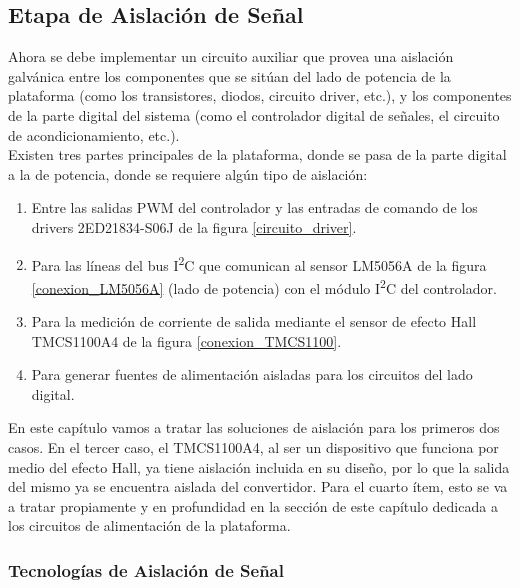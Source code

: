 \subsection{Etapa de Aislación de Señal}

Ahora se debe implementar un circuito auxiliar que provea una aislación galvánica entre los componentes que se sitúan del lado de potencia de la plataforma (como los transistores, diodos, circuito driver, etc.), y los componentes de la parte digital del sistema (como el controlador digital de señales, el circuito de acondicionamiento, etc.).\\

Existen tres partes principales de la plataforma, donde se pasa de la parte digital a la de potencia, donde se requiere algún tipo de aislación:\\

\begin{enumerate}
    \item Entre las salidas PWM del controlador y las entradas de comando de los drivers 2ED21834-S06J de la figura \ref{circuito_driver}.
    \item Para las líneas del bus I\textsuperscript{2}C que comunican al sensor LM5056A de la figura \ref{conexion_LM5056A} (lado de potencia) con el módulo I\textsuperscript{2}C del controlador.
    \item Para la medición de corriente de salida mediante el sensor de efecto Hall TMCS1100A4 de la figura \ref{conexion_TMCS1100}.
    \item Para generar fuentes de alimentación aisladas para los circuitos del lado digital.\\
\end{enumerate}

En este capítulo vamos a tratar las soluciones de aislación para los primeros dos casos. En el tercer caso, el TMCS1100A4, al ser un dispositivo que funciona por medio del efecto Hall, ya tiene aislación incluida en su diseño, por lo que la salida del mismo ya se encuentra aislada del convertidor. Para el cuarto ítem, esto se va a tratar propiamente y en profundidad en la sección de este capítulo dedicada a los circuitos de alimentación de la plataforma.\\

\subsubsection{Tecnologías de Aislación de Señal}

